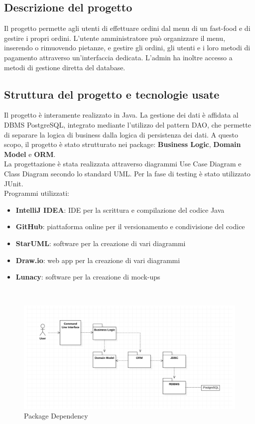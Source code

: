\documentclass{article}
\begin{document}
\subsection{Descrizione del progetto}
Il progetto permette agli utenti di effettuare ordini dal menu di un fast-food e di gestire i propri ordini. L'utente amministratore può organizzare il menu, inserendo o rimuovendo pietanze, e gestire gli ordini, gli utenti e i loro metodi di pagamento attraverso un'interfaccia dedicata. L'admin ha inoltre accesso a metodi di gestione diretta del database.


\subsection{Struttura del progetto e tecnologie usate}
Il progetto è interamente realizzato in Java. La gestione dei dati è affidata al DBMS PostgreSQL, integrato mediante l'utilizzo del pattern DAO, che permette di separare la logica di business dalla logica di persistenza dei dati. A questo scopo, il progetto è stato strutturato nei package: \textbf{Business Logic}, \textbf{Domain Model} e \textbf{ORM}.\\ La progettazione è stata realizzata attraverso diagrammi Use Case Diagram e Class Diagram secondo lo standard UML. Per la fase di testing è stato utilizzato JUnit. \\
Programmi utilizzati:
\begin{itemize}
    \item {\textbf{IntelliJ IDEA}}: IDE per la scrittura e compilazione del codice Java
    \item {\textbf{GitHub}}: piattaforma online per il versionamento e condivisione del codice
    \item {\textbf{StarUML}}: software per la creazione di vari diagrammi
    \item {\textbf{Draw.io}}: web app per la creazione di vari diagrammi
    \item {\textbf{Lunacy}}: software per la creazione di mock-ups
\end{itemize}
\\

\begin{figure}[H]
    \centering
    \includegraphics[width=0.9\linewidth]{imgs/PackageDependecy.png}
    \caption{Package Dependency}
    \label{PackageDependecy}
\end{figure}
\end{document}

